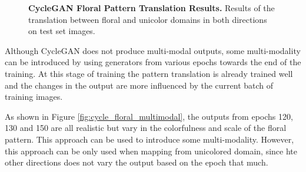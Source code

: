 \documentclass[12pt]{report}
\begin{document}
\begin{figure}[h]
\centering
{}
\caption{\label{fig:cycle_floral_results} \textbf{CycleGAN Floral Pattern Translation Results.} Results of the translation between floral and unicolor domains in both directions on test set images.}
\end{figure}

Although CycleGAN does not produce multi-modal outputs, some multi-modality can be introduced by using generators from various epochs towards the end of the training. At this stage of training the pattern translation is already trained well and the changes in the output are more influenced by the current batch of training images. 

As shown in Figure \ref{fig:cycle_floral_multimodal}, the outputs from epochs 120, 130 and 150 are all realistic but vary in the colorfulness and scale of the floral pattern. This approach can be used to introduce some multi-modality. However, this approach can be only used when mapping from unicolored domain, since hte other directions does not vary the output based on the epoch that much.
\end{document}
